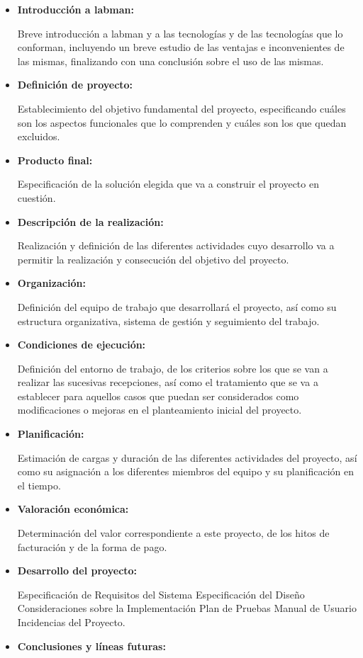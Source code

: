 \begin{itemize}
	\item \textbf{Introducción a \acrshort{labman}:}

	Breve introducción a \acrshort{labman} y a las tecnologías y de las tecnologías que lo conforman, incluyendo un breve estudio de las ventajas e inconvenientes de las mismas, finalizando con una conclusión sobre el uso de las mismas.

	\item \textbf{Definición de proyecto:}
		
	Establecimiento del objetivo fundamental del proyecto, especificando cuáles son los aspectos funcionales que lo comprenden y cuáles son los que quedan excluidos.
	
	\item \textbf{Producto final:}
		
	Especificación de la solución elegida que va a construir el proyecto en cuestión.
	
	\item \textbf{Descripción de la realización:}

	Realización y definición de las diferentes actividades cuyo desarrollo va a permitir la realización y consecución del objetivo del proyecto.

	\item \textbf{Organización:}
	
	Definición del equipo de trabajo que desarrollará el proyecto, así como su estructura organizativa, sistema de gestión y seguimiento del trabajo.

	\item \textbf{Condiciones de ejecución:}

	Definición del entorno de trabajo, de los criterios sobre los que se van a realizar las sucesivas recepciones, así como el tratamiento que se va a establecer para aquellos casos que puedan ser considerados como modificaciones o mejoras en el planteamiento inicial del proyecto.

	\item \textbf{Planificación:}
	
	Estimación de cargas y duración de las diferentes actividades del proyecto, así como su asignación a los diferentes miembros del equipo y su planificación en el tiempo.

	\item \textbf{Valoración económica:}
	
	Determinación del valor correspondiente a este proyecto, de los hitos de facturación y de la forma de pago.

	\item \textbf{Desarrollo del proyecto:}
	
	Especificación de Requisitos del Sistema Especificación del Diseño Consideraciones sobre la Implementación Plan de Pruebas Manual de Usuario Incidencias del Proyecto.

	\item \textbf{Conclusiones y líneas futuras:}


\end{itemize}





